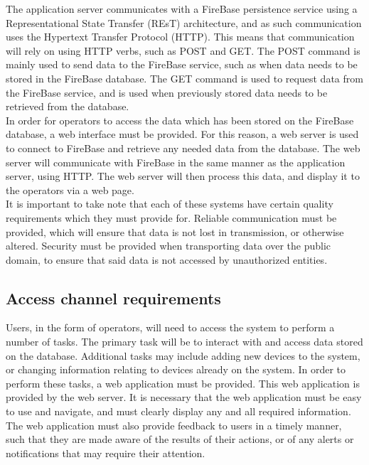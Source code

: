 \documentclass{article}
\begin{document}
	The application server communicates with a FireBase persistence service using a Representational State Transfer (REsT) architecture, and as such communication uses the Hypertext Transfer Protocol (HTTP). This means that communication will rely on using HTTP verbs, such as POST and GET. The POST command is mainly used to send data to the FireBase service, such as when data needs to be stored in the FireBase database. The GET command is used to request data from the FireBase service, and is used when previously stored data needs to be retrieved from the database.\\
	
	In order for operators to access the data which has been stored on the FireBase database, a web interface must be provided. For this reason, a web server is used to connect to FireBase and retrieve any needed data from the database. The web server will communicate with FireBase in the same manner as the application server, using HTTP. The web server will then process this data, and display it to the operators via a web page.\\
	
	It is important to take note that each of these systems have certain quality requirements which they must provide for. Reliable communication must be provided, which will ensure that data is not lost in transmission, or otherwise altered. Security must be provided when transporting data over the public domain, to ensure that said data is not accessed by unauthorized entities.
	
	\newpage
	
	\subsection{Access channel requirements}
	
	Users, in the form of operators, will need to access the system to perform a number of tasks. The primary task will be to interact with and access data stored on the database. Additional tasks may include adding new devices to the system, or changing information relating to devices already on the system. In order to perform these tasks, a web application must be provided. This web application is provided by the web server. It is necessary that the web application must be easy to use and navigate, and must clearly display any and all required information. The web application must also provide feedback to users in a timely manner, such that they are made aware of the results of their actions, or of any alerts or notifications that may require their attention.\\
	
\end{document}
